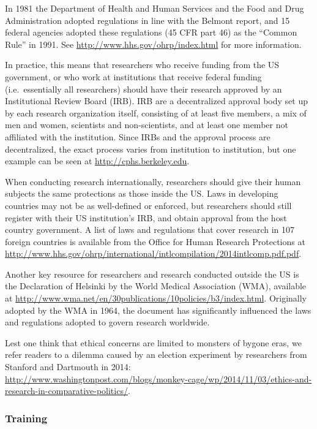 \documentclass[12pt] {article}
\begin{document}
In 1981 the Department of Health and Human Services and the Food and
Drug Administration adopted regulations in line with the Belmont report,
and 15 federal agencies adopted these regulations (45 CFR part 46) as
the ``Common Rule'' in 1991. See
\url{http://www.hhs.gov/ohrp/index.html} for more information.

In practice, this means that researchers who receive funding from the US
government, or who work at institutions that receive federal funding
(i.e.~essentially all researchers) should have their research approved
by an Institutional Review Board (IRB). IRB are a decentralized approval
body set up by each research organization itself, consisting of at least
five members, a mix of men and women, scientists and non-scientists, and
at least one member not affiliated with the institution. Since IRBs and
the approval process are decentralized, the exact process varies from
institution to institution, but one example can be seen at
\url{http://cphs.berkeley.edu}.

When conducting research internationally, researchers should give their
human subjects the same protections as those inside the US. Laws in
developing countries may not be as well-defined or enforced, but
researchers should still register with their US institution's IRB, and
obtain approval from the host country government. A list of laws and
regulations that cover research in 107 foreign countries is available
from the Office for Human Research Protections at
\url{http://www.hhs.gov/ohrp/international/intlcompilation/2014intlcomp.pdf.pdf}.

Another key resource for researchers and research conducted outside the
US is the Declaration of Helsinki by the World Medical Association
(WMA), available at
\url{http://www.wma.net/en/30publications/10policies/b3/index.html}.
Originally adopted by the WMA in 1964, the document has significantly
influenced the laws and regulations adopted to govern research
worldwide.

Lest one think that ethical concerns are limited to monsters of bygone
eras, we refer readers to a dilemma caused by an election experiment by
researchers from Stanford and Dartmouth in 2014:
\url{http://www.washingtonpost.com/blogs/monkey-cage/wp/2014/11/03/ethics-and-research-in-comparative-politics/}.

\subsubsection{Training}\label{training}
\end{document}
